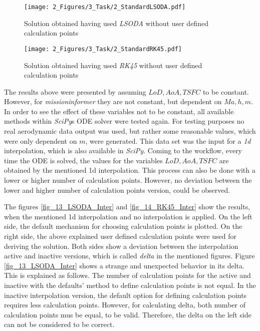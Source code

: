 \begin{figure}[!h]
    \centering
    \texttt{[image: 2\_Figures/3\_Task/2\_StandardLSODA.pdf]}
    \caption{Solution obtained having used \emph{LSODA} without user defined 
    calculation points}
    \label{fig_11_LSODA_Standard}
\end{figure}


\begin{figure}[!h]
    \centering
    \texttt{[image: 2\_Figures/3\_Task/2\_StandardRK45.pdf]}
    \caption{Solution obtained having used \emph{RK45} without user defined 
    calculation points}
    \label{fig_12_RK45_Standard}
\end{figure}



\FloatBarrier
The results above were presented by assuming 
$LoD, AoA, TSFC$ to be constant. However, 
for \emph{missioninformer} they are not constant, but 
dependent on $Ma, h, m$. In order 
to see the effect of these variables not to 
be constant, all available methods 
within \emph{SciPy}s ODE solver were tested again.
For testing purposes no real aerodynamic 
data output was used, but rather some 
reasonable values, which were only dependent 
on $m$, were generated. This data 
set was the input for a \emph{1d} interpolation, which 
is also available in \emph{SciPy}. Coming to 
the workflow, every time the ODE is solved, the 
values for the variables $LoD, AoA, TSFC$ are 
obtained by the mentioned 1d interpolation.
This process can also be done with a lower 
or higher number of calculation points.
However, no deviation between the lower 
and higher number of calculation points 
version, could 
be observed.\newline 

The figures \ref{fig_13_LSODA_Inter} and 
\ref{fig_14_RK45_Inter} show the results, when the mentioned
1d interpolation and no interpolation is applied.
On the left side, the default mechanism 
for choosing calculation points is plotted.
On the right side, the above explained 
user defined calculation points were 
used for deriving the solution. Both 
sides show a deviation between 
the interpolation active and inactive versions, which 
is called \emph{delta} in the mentioned figures.
Figure \eqref{fig_13_LSODA_Inter} shows 
a strange and unexpected behavior in 
its delta. This is explained as follows.
The number of calculation 
points for the active and inactive 
with the defaults' 
method to define calculation points is 
not equal. 
In the inactive interpolation version, the 
default option for defining 
calculation points 
requires less calculation points.
However, for calculating delta, 
both number of calculation points 
mus be equal, to be valid.
Therefore,
the delta on the left side can 
not be considered to be correct. \newline 


